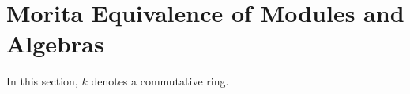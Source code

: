 \section{Morita Equivalence of Modules and Algebras}

In this section, \(k\) denotes a commutative ring.

